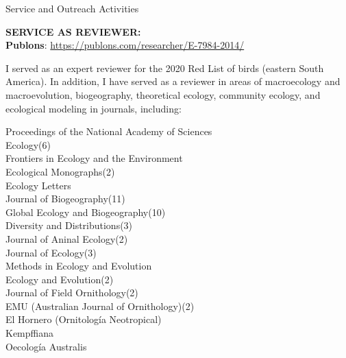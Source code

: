\documentclass{resume} %
\begin{document}

\begin{rSection}{Service and Outreach Activities}

\textbf{SERVICE AS REVIEWER:} \smallskip \\ 
\textbf{Publons}: \url{https://publons.com/researcher/E-7984-2014/}

I served as an expert reviewer for the 2020 Red List of birds (eastern South America). In addition, I have served as a reviewer in areas of macroecology and macroevolution, biogeography, theoretical ecology, community ecology, and ecological modeling in journals, including: \smallskip

\begin{multicols}{2}

Proceedings of the National Academy of Sciences \\
Ecology(6) \\
Frontiers in Ecology and the Environment \\
Ecological Monographs(2) \\
Ecology Letters \\
Journal of Biogeography(11) \\ 
Global Ecology and Biogeography(10) \\
Diversity and Distributions(3) \\ 
Journal of Aninal Ecology(2) \\
Journal of Ecology(3) \\ 
Methods in Ecology and Evolution \\ 
Ecology and Evolution(2) \\ 
Journal of Field Ornithology(2) \\
EMU (Australian Journal of Ornithology)(2) \\
El Hornero (Ornitología Neotropical) \\
Kempffiana \\ 
Oecología Australis \smallskip

\columnbreak


\end{multicols}
\end{rSection}
\end{document}
